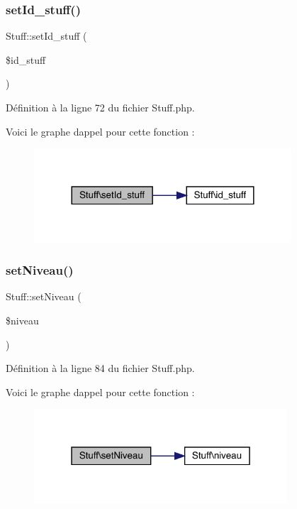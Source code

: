 \subsubsection{\texorpdfstring{set\+Id\+\_\+stuff()}{setId\_stuff()}}
{\footnotesize\ttfamily Stuff\+::set\+Id\+\_\+stuff (\begin{DoxyParamCaption}\item[{}]{\$id\+\_\+stuff }\end{DoxyParamCaption})}



Définition à la ligne 72 du fichier Stuff.\+php.

Voici le graphe d\textquotesingle{}appel pour cette fonction \+:\nopagebreak
\begin{figure}[H]
\begin{center}
\leavevmode
\includegraphics[width=272pt]{class_stuff_ab06c44c241a0322978a44dffabac731d_cgraph}
\end{center}
\end{figure}
\mbox{\label{class_stuff_ad30226d936b128c511c6af7b542d8966}} 
\subsubsection{\texorpdfstring{set\+Niveau()}{setNiveau()}}
{\footnotesize\ttfamily Stuff\+::set\+Niveau (\begin{DoxyParamCaption}\item[{}]{\$niveau }\end{DoxyParamCaption})}



Définition à la ligne 84 du fichier Stuff.\+php.

Voici le graphe d\textquotesingle{}appel pour cette fonction \+:\nopagebreak
\begin{figure}[H]
\begin{center}
\leavevmode
\includegraphics[width=268pt]{class_stuff_ad30226d936b128c511c6af7b542d8966_cgraph}
\end{center}
\end{figure}
\mbox{\label{class_stuff_aa7fef5150533f454fcfed30206a31d45}} 
